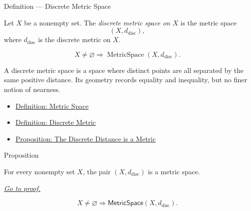 \begin{definitionbox}{Definition --- Discrete Metric Space}
\begin{definition}\label{def:discrete-metric-space}
Let \(X\) be a nonempty set.  The \emph{discrete metric space on \(X\)} is the
metric space
\[
  (X,d_{\mathrm{disc}}),
\]
where \(d_{\mathrm{disc}}\) is the discrete metric on \(X\).
\end{definition}
\end{definitionbox}

\begin{remark*}
\[
X\neq\varnothing
\Longrightarrow
\operatorname{MetricSpace}(X,d_{\mathrm{disc}}).
\]
\end{remark*}

\begin{remark*}[Interpretation]
A discrete metric space is a space where distinct points are all separated by
the same positive distance.  Its geometry records equality and inequality, but
no finer notion of nearness.
\end{remark*}

\begin{dependencies}
\begin{itemize}
  \item \hyperref[def:metric-space]{Definition: Metric Space}
  \item \hyperref[def:discrete-metric]{Definition: Discrete Metric}
  \item \hyperref[prop:discrete-metric-space]{Proposition: The Discrete Distance is a Metric}
\end{itemize}
\end{dependencies}

\begin{propositionbox}{Proposition}
\begin{proposition}
\label{prop:discrete-metric-space-instance}
For every nonempty set \(X\), the pair \((X,d_{\mathrm{disc}})\) is a metric space.

\smallskip
\noindent
\hyperref[prf:discrete-metric-space-instance]{\textit{Go to proof.}}
\end{proposition}
\end{propositionbox}

\begin{remark*}
\[
  X\neq\varnothing\Longrightarrow\mathsf{MetricSpace}(X,d_{\mathrm{disc}}).
\]
\end{remark*}


